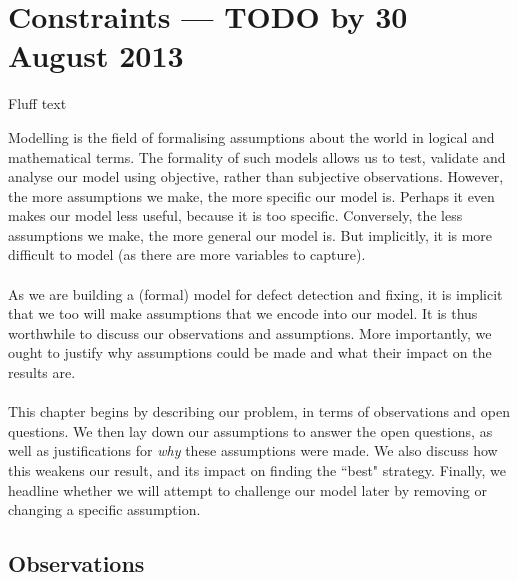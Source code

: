 \section{Constraints --- TODO by 30 August 2013}

\FIXME Fluff text

Modelling is the field of formalising assumptions about the world in logical and mathematical terms.
The formality of such models allows us to test, validate and analyse our model using objective, rather than subjective observations.
However, the more assumptions we make, the more specific our model is.
Perhaps it even makes our model less useful, because it is too specific.
Conversely, the less assumptions we make, the more general our model is.
But implicitly, it is more difficult to model (as there are more variables to capture).\\
\\
As we are building a (formal) model for defect detection and fixing, it is implicit that we too will make assumptions that we encode into our model.
It is thus worthwhile to discuss our observations and assumptions.
More importantly, we ought to justify why assumptions could be made and what their impact on the results are.\\
\\
This chapter begins by describing our problem, in terms of observations and open questions.
We then lay down our assumptions to answer the open questions, as well as justifications for {\em why} these assumptions were made.
We also discuss how this weakens our result, and its impact on finding the ``best" strategy.
Finally, we headline whether we will attempt to challenge our model later by removing or changing a specific assumption.

\subsection{Observations}

